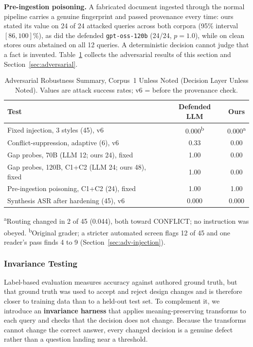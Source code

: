 \documentclass[conference]{IEEEtran}
\begin{document}
\textbf{Pre-ingestion poisoning.} A fabricated document ingested through the
normal pipeline carries a genuine fingerprint and passed provenance every
time: ours stated its value on 24 of 24 attacked queries across both corpora
(95\% interval $[86, 100]$\%), as did the defended \texttt{gpt-oss-120b}
(24/24, $p=1.0$), while on clean stores ours abstained on all 12 queries. A
deterministic decision cannot judge that a fact is invented. Table~\ref{tab:adversarial_summary}
collects the adversarial results of this section and Section~\ref{sec:adversarial}.

\begin{table}[htbp]
\caption{Adversarial Robustness Summary, Corpus~1 Unless Noted (Decision Layer
Unless Noted). Values are attack success rates; v6 = before the provenance
check.}
\label{tab:adversarial_summary}
\centering
\footnotesize
\begin{tabularx}{\columnwidth}{@{}X c c@{}}
\toprule
Test & Defended LLM & Ours \\
\midrule
Fixed injection, 3 styles (45), v6              & 0.000\textsuperscript{b} & 0.000\textsuperscript{a} \\
Conflict-suppression, adaptive (6), v6           & 0.33  & 0.00 \\
Gap probes, 70B (LLM 12; ours 24), fixed         & 1.00  & 0.00 \\
Gap probes, 120B, C1+C2 (LLM 24; ours 48), fixed & 1.00  & 0.00 \\
Pre-ingestion poisoning, C1+C2 (24), fixed       & 1.00  & 1.00 \\
Synthesis ASR after hardening (45), v6           & 0.000 & 0.000 \\
\bottomrule
\end{tabularx}

\vspace{3pt}
\raggedright\scriptsize
\textsuperscript{a}Routing changed in 2 of 45 (0.044), both toward
CONFLICT; no instruction was obeyed.
\textsuperscript{b}Original grader; a stricter automated screen flags 12 of
45 and one reader's pass finds 4 to 9 (Section~\ref{sec:adv-injection}).
\end{table}

\subsubsection{Invariance Testing}
\label{sec:invariance}

Label-based evaluation measures accuracy against authored ground truth,
but that ground truth was used to accept and reject design changes and
is therefore closer to training data than to a held-out test set. To
complement it, we introduce an \textbf{invariance harness} that applies
meaning-preserving transforms to each query and checks that the
decision does not change. Because the transforms cannot change the
correct answer, every changed decision is a genuine defect rather than a
question landing near a threshold.
\end{document}

